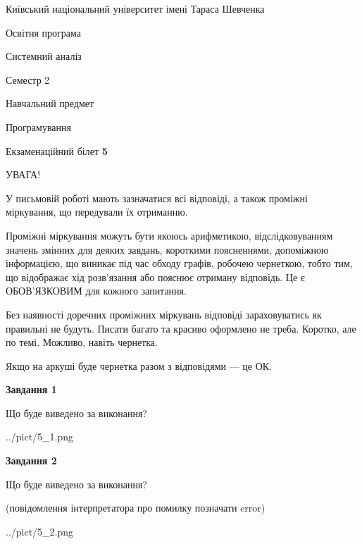 \documentclass[12pt, ukrainian]{article}
\begin{document}
{{\begin {small}\par
{ \center  Київський національний університет імені Тараса Шевченка \par}
{\parbox {5 cm}{Освітня програма \hfill}{\parbox {7 cm}{Системний аналіз \hfill}}\parbox {6 cm}{\hfill Семестр 2}}\par
{\parbox {5 cm} {Навчальний предмет \hfill}\parbox {7 cm}{Програмування \hfill}\parbox {6cm}{\hfill}\par}\vspace{-7pt} \end{small}}{\center Екзаменаційний білет \No \textbf
{ 5 }\par}}
{
\begin {large}
УВАГА!

У письмовій роботі мають зазначатися всі відповіді, а також проміжні міркування, що передували їх отриманню.

Проміжні міркування можуть бути якоюсь арифметикою, відслідковуванням зна\-чень змінних для деяких завдань,
короткими поясненнями, допоміжною інформацією, що виникає під час обходу графів, робочею чернеткою,
тобто тим, що відображає хід розв’язання або пояснює отриману відповідь.
Це є ОБОВ’ЯЗКОВИМ для кожного запитання.

Без наявності доречних проміжних міркувань відповіді зараховуватись як правиль\-ні не будуть.
Писати багато та красиво оформлено не треба. Коротко, але по темі. Можли\-во, навіть чернетка.

Якщо на аркуші буде чернетка разом з відповідями --- це ОК.

\newpage

{\begin {center}\textbf{Завдання 1}\end {center}}\par
Що буде виведено за виконання?\par
\begin{center}
	{../pict/5_1.png}
\end{center}
\newpage

{\begin {center}\textbf{Завдання 2}\end {center}}\par
Що буде виведено за виконання?\par
 (повідомлення інтерпретатора про помилку позначати error)\par
\begin{center}
	{../pict/5_2.png}
\end{center}
\newpage


\end{large}}
\end{document}
